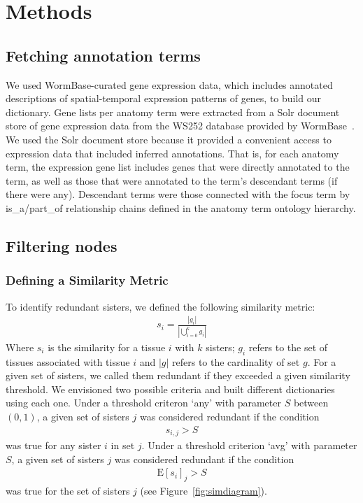 \documentclass{bmcart}
\begin{document}
\section*{Methods}
\subsection*{Fetching annotation terms}
We used WormBase-curated gene expression data, which includes annotated descriptions of spatial-temporal expression patterns of genes, to build our dictionary. Gene lists per anatomy term were extracted from a Solr document store of gene expression data from the WS252 database provided by WormBase~\cite{Howe2016}. We used the Solr document store because it provided a convenient access to expression data that included inferred annotations. That is, for each anatomy term, the expression gene list includes genes that were directly annotated to the term, as well as those that were annotated to the term's descendant terms (if there were any). Descendant terms were those connected with the focus term by is\_a/part\_of relationship chains defined in the anatomy term ontology hierarchy. 
\subsection*{Filtering nodes}
\subsubsection*{Defining a Similarity Metric}
To identify redundant sisters, we defined the following similarity metric:
\begin{eqnarray}\label{similarity def}
	s_i = \frac{|g_i|}{|\bigcup_{i= 0}^k g_i|}
\end{eqnarray}
Where $s_i$ is the similarity for a tissue $i$ with $k$ sisters; $g_i$ refers to the set of tissues associated with tissue $i$ and $|g|$ refers to the cardinality of set $g$. For a given set of sisters, we called them redundant if they exceeded a given similarity threshold. We envisioned two possible criteria and built different dictionaries using each one. Under a threshold criteron `any' with parameter $S$ between $(0, 1)$, a given set of sisters $j$ was considered redundant if the condition
\begin{eqnarray}\label{any threshold}
	s_{i, j} > S
\end{eqnarray}
was true for any sister $i$ in set $j$. Under a threshold criterion `avg' with parameter $S$, a given set of sisters $j$ was considered redundant if the condition
\begin{eqnarray}\label{avg threshold}
	\mathrm{E}[s_i]_j > S
\end{eqnarray}
was true for the set of sisters $j$ (see Figure~\ref{fig:simdiagram}). 
\end{document}
